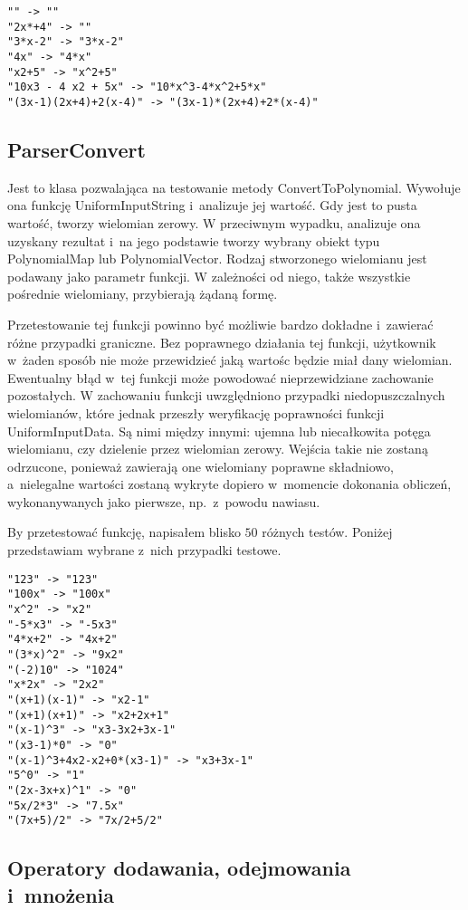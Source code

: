 \begin{lstlisting}
"" -> ""
"2x*+4" -> ""
"3*x-2" -> "3*x-2"
"4x" -> "4*x"
"x2+5" -> "x^2+5"
"10x3 - 4 x2 + 5x" -> "10*x^3-4*x^2+5*x"
"(3x-1)(2x+4)+2(x-4)" -> "(3x-1)*(2x+4)+2*(x-4)"
\end{lstlisting}

\subsection{ParserConvert}

Jest to klasa pozwalająca na testowanie metody ConvertToPolynomial. Wywołuje ona funkcję UniformInputString i~analizuje jej wartość. Gdy jest to pusta wartość, tworzy wielomian zerowy. W przeciwnym wypadku, analizuje ona uzyskany rezultat i~na jego podstawie tworzy wybrany obiekt typu PolynomialMap lub PolynomialVector. Rodzaj stworzonego wielomianu jest podawany jako parametr funkcji. W zależności od niego, także wszystkie pośrednie wielomiany, przybierają żądaną formę.

Przetestowanie tej funkcji powinno być możliwie bardzo dokładne i~zawierać różne przypadki graniczne. Bez poprawnego działania tej funkcji, użytkownik w~żaden sposób nie może przewidzieć jaką wartośc będzie miał dany wielomian. Ewentualny błąd w~tej funkcji może powodować nieprzewidziane zachowanie pozostałych. W zachowaniu funkcji uwzględniono przypadki niedopuszczalnych wielomianów, które jednak przeszły weryfikację poprawności funkcji UniformInputData. Są nimi między innymi: ujemna lub niecałkowita potęga wielomianu, czy dzielenie przez wielomian zerowy. Wejścia takie nie zostaną odrzucone, ponieważ zawierają one wielomiany poprawne składniowo, a~nielegalne wartości zostaną wykryte dopiero w~momencie dokonania obliczeń, wykonanywanych jako pierwsze, np.\ z~powodu nawiasu.

By przetestować funkcję, napisałem blisko $50$ różnych testów. Poniżej przedstawiam wybrane z~nich przypadki testowe.

\begin{lstlisting}
"123" -> "123"
"100x" -> "100x"
"x^2" -> "x2"
"-5*x3" -> "-5x3"
"4*x+2" -> "4x+2"
"(3*x)^2" -> "9x2"
"(-2)10" -> "1024"
"x*2x" -> "2x2"
"(x+1)(x-1)" -> "x2-1"
"(x+1)(x+1)" -> "x2+2x+1"
"(x-1)^3" -> "x3-3x2+3x-1"
"(x3-1)*0" -> "0"
"(x-1)^3+4x2-x2+0*(x3-1)" -> "x3+3x-1"
"5^0" -> "1"
"(2x-3x+x)^1" -> "0"
"5x/2*3" -> "7.5x"
"(7x+5)/2" -> "7x/2+5/2"
\end{lstlisting}

\subsection{Operatory dodawania, odejmowania i~mnożenia}

